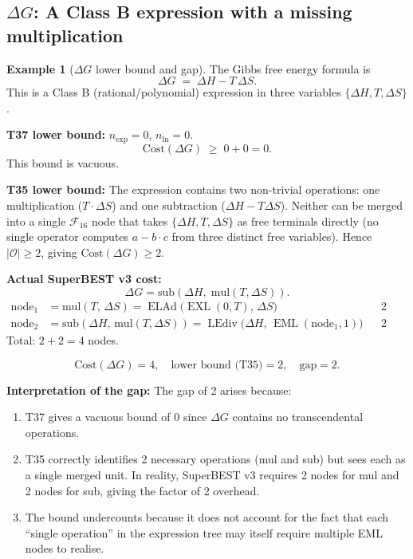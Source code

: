 \documentclass[12pt,a4paper]{article}
\theoremstyle{definition}
\newtheorem{example}[theorem]{Example}
\newcommand{\EML}{\operatorname{EML}}
\newcommand{\EXL}{\operatorname{EXL}}
\newcommand{\ELAd}{\operatorname{ELAd}}
\newcommand{\LEdiv}{\operatorname{LEdiv}}
\newcommand{\Cost}{\mathrm{Cost}}
\newcommand{\Fam}{\mathcal{F}}
\begin{document}
\subsection{\texorpdfstring{$\Delta G$}{DeltaG}: A Class B expression with a missing multiplication}

\begin{example}[$\Delta G$ lower bound and gap]\label{ex:DeltaG}
The Gibbs free energy formula is
\[
  \Delta G \;=\; \Delta H - T\,\Delta S.
\]
This is a Class B (rational/polynomial) expression in three variables
$\{\Delta H, T, \Delta S\}$.

\medskip
\noindent\textbf{T37 lower bound:}
$n_{\exp} = 0$, $n_{\ln} = 0$.
\[
  \Cost(\Delta G) \;\geq\; 0 + 0 = 0.
\]
This bound is vacuous.

\medskip
\noindent\textbf{T35 lower bound:}
The expression contains two non-trivial operations: one multiplication
($T \cdot \Delta S$) and one subtraction ($\Delta H - T\Delta S$).
Neither can be merged into a single $\Fam_{16}$ node that takes
$\{\Delta H, T, \Delta S\}$ as free terminals directly (no single operator
computes $a - b\cdot c$ from three distinct free variables).
Hence $|\mathcal{O}| \geq 2$, giving $\Cost(\Delta G) \geq 2$.

\medskip
\noindent\textbf{Actual SuperBEST v3 cost:}
\[
  \Delta G = \mathrm{sub}(\Delta H,\;\mathrm{mul}(T,\Delta S)).
\]
\begin{align*}
  \mathrm{node}_1 &= \mathrm{mul}(T,\,\Delta S) = \ELAd\!\bigl(\EXL(0,T),\,\Delta S\bigr)
                  && \text{2 nodes (T10u)} \\
  \mathrm{node}_2 &= \mathrm{sub}(\Delta H,\,\mathrm{mul}(T,\Delta S))
                   = \LEdiv\!\bigl(\Delta H,\,\EML(\mathrm{node}_1,1)\bigr)
                  && \text{2 nodes (T33)}
\end{align*}
Total: $2 + 2 = 4$ nodes.

\medskip
\[
  \boxed{\Cost(\Delta G) = 4,\quad \text{lower bound (T35)} = 2,\quad \text{gap} = 2.}
\]

\medskip
\noindent\textbf{Interpretation of the gap:}
The gap of 2 arises because:
\begin{enumerate}
  \item T37 gives a vacuous bound of 0 since $\Delta G$ contains no
        transcendental operations.
  \item T35 correctly identifies 2 necessary operations (mul and sub) but
        sees each as a single merged unit.  In reality, SuperBEST v3 requires
        2 nodes for mul and 2 nodes for sub, giving the factor of 2 overhead.
  \item The bound undercounts because it does not account for the fact that
        each ``single operation'' in the expression tree may itself require
        multiple EML nodes to realise.
\end{enumerate}
\end{example}
\end{document}
